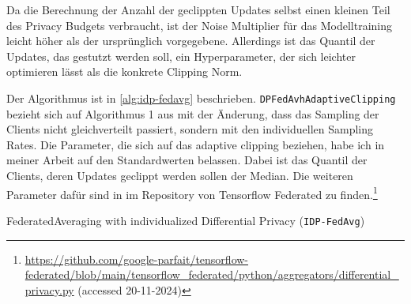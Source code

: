 Da die Berechnung der Anzahl der geclippten Updates selbst einen kleinen Teil des Privacy Budgets verbraucht, ist der Noise Multiplier für das Modelltraining leicht höher als der ursprünglich vorgegebene. Allerdings ist das Quantil der Updates, das gestutzt werden soll, ein Hyperparameter, der sich leichter optimieren lässt als die konkrete Clipping Norm.

Der Algorithmus ist in \autoref{alg:idp-fedavg} beschrieben. \texttt{DPFedAvhAdaptiveClipping} bezieht sich auf Algorithmus 1 aus \textcite[p.4]{andrew:2021} mit der Änderung, dass das Sampling der Clients nicht gleichverteilt passiert, sondern mit den individuellen Sampling Rates. Die Parameter, die sich auf das adaptive clipping beziehen, habe ich in meiner Arbeit auf den Standardwerten belassen. Dabei ist das Quantil der Clients, deren Updates geclippt werden sollen der Median. Die weiteren Parameter dafür sind in im Repository von Tensorflow Federated zu finden.\footnote{\url{https://github.com/google-parfait/tensorflow-federated/blob/main/tensorflow_federated/python/aggregators/differential_privacy.py} (accessed 20-11-2024)}


\begin{algorithm}[tb]
	\caption{FederatedAveraging with individualized Differential Privacy (\texttt{IDP-FedAvg})}
	\label{alg:idp-fedavg}
\end{algorithm}